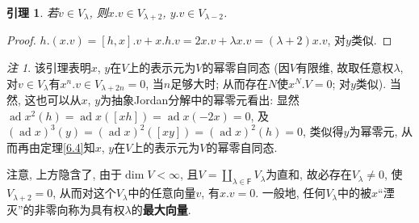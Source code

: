 \documentclass{ctexart}%
\newtheorem{lemma}{引理}
\theoremstyle{definition}
\theoremstyle{remark}
\newtheorem{remark}{注}
\DeclareMathOperator{\ad}{ad}
\begin{document}
\begin{lemma} 若$v\in V_\lambda$, 则$x.v\in V_{\lambda+2}$, $y.v\in V_{\lambda-2}$.
\end{lemma}
\begin{proof} $h.(x.v)=[h,x].v+x.h.v=2x.v+\lambda x.v = (\lambda+2)x.v$, 对$y$类似.
\end{proof}
\begin{remark}
该引理表明$x$, $y$在$V$上的表示元为$V$的幂零自同态 (因$V$有限维, 故取任意权$\lambda$, 对$v\in V_\lambda$有$x^n.v \in V_{\lambda+2n}=0$, 当$n$足够大时; 从而存在$N$使$x^N.V=0$; 对$y$类似). 当然, 这也可以从$x$, $y$为抽象Jordan分解中的幂零元看出: 显然$\ad x^2 (h) = \ad x ([xh]) = \ad x(-2x) = 0$, 及$(\ad x)^3(y) = (\ad x)^2 ([xy]) = (\ad x)^2(h) = 0$, 类似得$y$为幂零元, 从而再由定理\ref{6.4}知$x$, $y$在$V$上的表示元为$V$的幂零自同态. 

注意, 上方隐含了, 由于$\dim V<\infty$, 且$V=\coprod_{\lambda \in \mathsf{F}} V_\lambda$为直和, 故必存在$V_\lambda \neq 0$, 使$V_{\lambda+2}=0$, 从而对这个$V_\lambda$中的任意向量$v$, 有$x.v=0$. 一般地, 任何$V_\lambda$中的被$x$``湮灭''的非零向称为具有权$\lambda$的\textbf{最大向量}. 
\end{remark}
\end{document}
